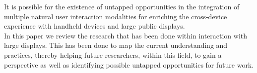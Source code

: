 It is possible for the existence of untapped opportunities in the integration of multiple natural user interaction modalities for enriching the cross-device experience with handheld devices and large public displays. \\

In this paper we review the research that has been done within interaction with large displays. 
This has been done to map the current understanding and practices, thereby helping future researchers, within this field, to gain a perspective as well as identifying possible untapped opportunities for future work.